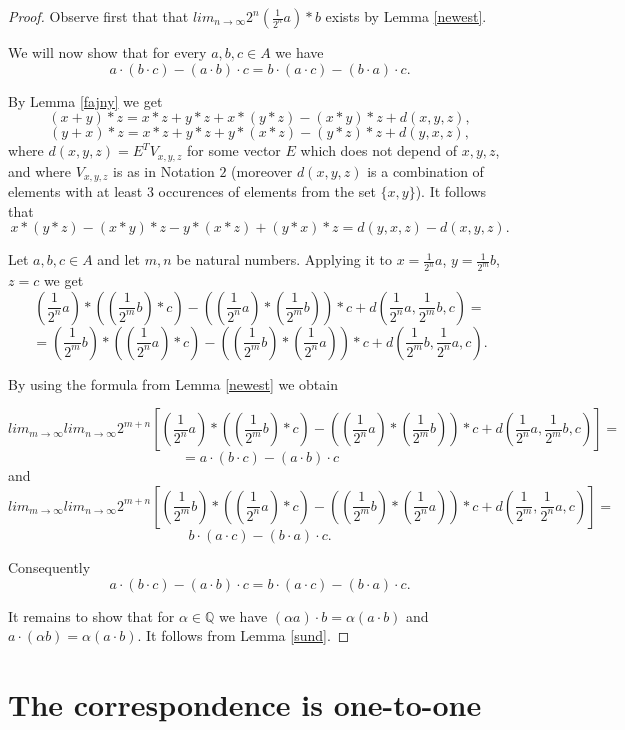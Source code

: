 \documentclass[12pt]{article}
\begin{document}
\begin{proof}
 Observe first that that $lim _{n\rightarrow \infty }2^{n}({\frac 1{2^{n}}} a)*b$ exists by Lemma \ref{newest}.

 We will now show that for every $a,b,c\in A$ we have
\[a\cdot (b\cdot c)-(a\cdot b)\cdot c=b\cdot (a\cdot c)-(b\cdot a)\cdot c.\]


  By Lemma \ref{fajny} we get 
\[(x+y)*z=x*z+y*z +x*(y*z)-(x*y)*z +d(x,y,z),\]
\[ (y+x)*z=x*z+y*z+y*(x*z)-(y*z)*z +d(y,x, z),\]
where $d(x, y, z)=E^{T}V_{x, y, z}$ for some vector $E$ which does not depend of $x, y, z$, and where $V_{x, y, z}$ is as in Notation $2$ (moreover $d(x, y, z)$ is a combination of elements with at least 3 occurences of elements from the set $\{x, y\}$). 
 It follows that 
\[x*(y*z)-(x*y)*z-y*(x*z)+(y*x)*z=d(y, x, z)-d(x, y, z).\]


Let $a,b,c\in A$ and let $m, n$ be natural numbers.
  Applying it to $x={\frac 1{2^{n}}}a$, $y={\frac 1{2^{m}}}b$, $z=c$ we get 
\[({\frac 1{2^{n}}}a)*(({\frac 1{2^{m}}}b)*c)-(({\frac 1{2^{n}}}a)*({\frac 1{2^{m}}}b))*c+d({\frac 1{2^{n}}}a,{\frac 1{2^{m}}}b,c)=\]
\[ =({\frac 1{2^{m}}}b)*(({\frac 1{2^{n}}}a)*c)-(({\frac 1{2^{m}}}b)*({\frac 1{2^{n}}}a))*c+d({\frac 1{2^{m}}}b,{\frac 1{2^{n}}}a, c).\]

 By using the formula from Lemma \ref{newest} we obtain 

 \[lim_{m\rightarrow \infty }lim _{n\rightarrow \infty }2^{m+n}[({\frac 1{2^{n}}}a)*(({\frac 1{2^{m}}}b)*c)-(({\frac 1{2^{n}}}a)*({\frac 1{2^{m}}}b))*c+d({\frac 1{2^{n}}}a,{\frac 1{2^{m}}}b,c)]=\]
\[=a\cdot (b\cdot c)-(a\cdot b)\cdot c\]
and 
 \[lim_{m\rightarrow \infty }lim _{n\rightarrow \infty }2^{m+n}[({\frac 1{2^{m}}}b)*(({\frac 1{2^{n}}}a)*c)-(({\frac 1{2^{m}}}b)*({\frac 1{2^{n}}}a))*c+d({\frac 1{2^{m}}},{\frac 1{2^{n}}}a, c)]=\]
\[b\cdot (a\cdot c)-(b\cdot a)\cdot c.\]

 Consequently 
\[a\cdot (b\cdot c)-(a\cdot b)\cdot c=b\cdot (a\cdot c)-(b\cdot a)\cdot c.\]

 It remains to show that for $\alpha \in \mathbb Q$ we have
$(\alpha a)\cdot b=\alpha (a\cdot b)$ and $a\cdot (\alpha b)=\alpha (a\cdot b)$. It follows from Lemma \ref{sund}.

\end{proof}

\section{The correspondence is one-to-one}\label{fasola}
\end{document}
